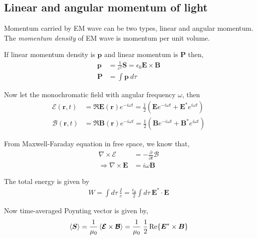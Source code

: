 \documentclass[11pt,a4paper]{article}
\numberwithin{equation}{section}
\begin{document}
\subsection{Linear and angular momentum of light}
 Momentum carried by EM wave can be two types, linear and angular momentum. The \textit{momentum density} of EM wave is momentum per unit volume.
 
If linear momentum density is $\boldsymbol{p}$ and linear momentum is $\boldsymbol{P}$ then,
\begin{align}
	\boldsymbol{p} &= \frac{1}{c^2}\boldsymbol{S} = \epsilon_0 \boldsymbol{E} \times \boldsymbol{B}\label{eq:3.1}\\
	\boldsymbol{P} &= \int \boldsymbol{p} \:d\tau \label{eq:3.2}
\end{align}

Now let the monochromatic field with angular frequency $\omega$, then
\begin{align}
	\boldsymbol{\mathcal{E}}(\boldsymbol{r},t) &= \Re{\boldsymbol{E}(\boldsymbol{r}) e^{-i \omega t }} = \frac{1}{2}(\boldsymbol{E} e^{-i \omega t } +\boldsymbol{E}^\ast e^{i \omega t})\\
	\boldsymbol{\mathcal{B}}(\boldsymbol{r},t) &= \Re{\boldsymbol{B}(\boldsymbol{r}) e^{-i \omega t }} = \frac{1}{2}(\boldsymbol{B} e^{-i \omega t } +\boldsymbol{B}^\ast e^{i \omega t})
\end{align}

From Maxwell-Faraday equation in free space, we know that, \cite{haus}
\begin{align}
	\nabla\times\boldsymbol{\mathcal{E}}&= - \frac{\partial}{\partial t}\boldsymbol{\mathcal{B}}\\
	\Rightarrow \nabla\times\boldsymbol{E}&= i\omega \boldsymbol{B} \label{eq:3.6}
\end{align}

The total energy is given by
\begin{align}
	W = \int d\tau\: \frac{I}{c}=\frac{\epsilon_0}{2}\int d\tau\: \boldsymbol{E}^\ast\cdot\boldsymbol{E}
\end{align}

Now time-averaged Poynting vector is given by, \cite{poynting}\cite{haus}
\begin{align}
	\expval{\boldsymbol{S}} =\frac{1}{\mu_0}\expval{\boldsymbol{\mathcal{E}} \times \boldsymbol{\mathcal{B}}} =\frac{1}{\mu_0}\; \frac{1}{2} \Re{\boldsymbol{E}^\ast \times \boldsymbol{B}} \label{eq:3.8}
\end{align}
\end{document}
